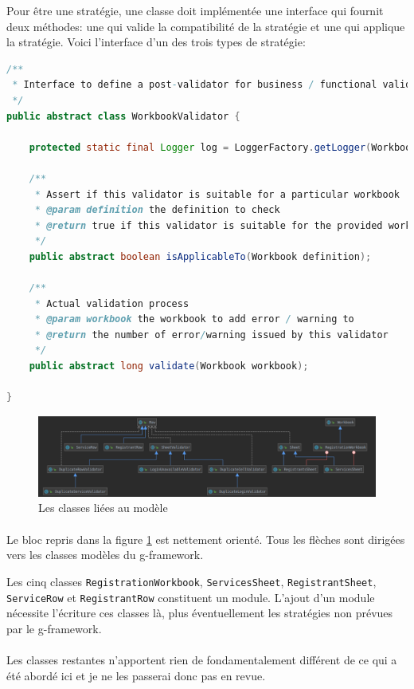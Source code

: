 Pour être une stratégie, une classe doit implémentée une interface qui fournit deux méthodes: une qui valide la compatibilité de la stratégie et une qui applique la stratégie.
Voici l'interface d'un des trois types de stratégie:
\begin{lstlisting}[language=Java]
/**
 * Interface to define a post-validator for business / functional validation in the whole workbook
 */
public abstract class WorkbookValidator {

	protected static final Logger log = LoggerFactory.getLogger(WorkbookValidator.class);
	
	/**
	 * Assert if this validator is suitable for a particular workbook
	 * @param definition the definition to check
	 * @return true if this validator is suitable for the provided workbook
	 */
	public abstract boolean isApplicableTo(Workbook definition);
	
	/**
	 * Actual validation process
	 * @param workbook the workbook to add error / warning to
	 * @return the number of error/warning issued by this validator
	 */
	public abstract long validate(Workbook workbook);

}
\end{lstlisting}

\begin{figure}[ht]
    \centering
    \includegraphics[width=1\textwidth]{images/diagrams/row-dependencies.png}
    \caption{Les classes liées au modèle}
    \label{fig:class-model}
\end{figure}
\paragraph{}
Le bloc repris dans la figure \ref{fig:class-model} est nettement orienté.
Tous les flèches sont dirigées vers les classes modèles du \gls{g-framework}.

Les cinq classes \lstinline{RegistrationWorkbook}, \lstinline{ServicesSheet}, \lstinline{RegistrantSheet}, \lstinline{ServiceRow} et \lstinline{RegistrantRow} constituent un module.
L'ajout d'un module nécessite l'écriture ces classes là, plus éventuellement les stratégies non prévues par le \gls{g-framework}.

\paragraph{}
Les classes restantes n'apportent rien de fondamentalement différent de ce qui a été abordé ici et je ne les passerai donc pas en revue.
